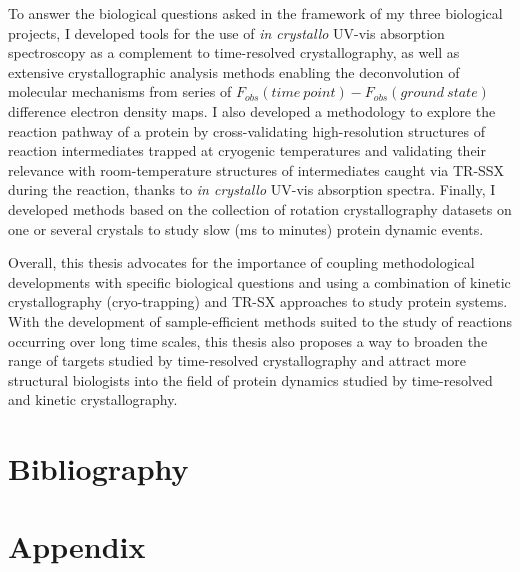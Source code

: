 \documentclass{report}
\begin{document}
To answer the biological questions asked in the framework of my three biological projects, I developed tools for the use of \textit{in crystallo} UV-vis absorption spectroscopy as a complement to time-resolved crystallography, as well as extensive crystallographic analysis methods enabling the deconvolution of molecular mechanisms from series of \(F_{obs}(time\ point) - F_{obs}(ground\ state)\) difference electron density maps. I also developed a methodology to explore the reaction pathway of a protein by cross-validating high-resolution structures of reaction intermediates trapped at cryogenic temperatures and validating their relevance with room-temperature structures of intermediates caught via TR-SSX during the reaction, thanks to \textit{in crystallo} UV-vis absorption spectra.  Finally, I developed methods based on the collection of rotation crystallography datasets on one or several crystals to study slow (ms to minutes) protein dynamic events.

\vspace{2mm}

Overall, this thesis advocates for the importance of coupling methodological developments with specific biological questions and using a combination of kinetic crystallography (cryo-trapping) and TR-SX approaches to study protein systems. With the development of sample-efficient methods suited to the study of reactions occurring over long time scales, this thesis also proposes a way to broaden the range of targets studied by time-resolved crystallography and attract more structural biologists into the field of protein dynamics studied by time-resolved and kinetic crystallography. 

\pagebreak
	{}

\pagebreak
\part{ Bibliography}
\printbibliography

\pagebreak

\part*{Appendix}
    {}
\end{document}
